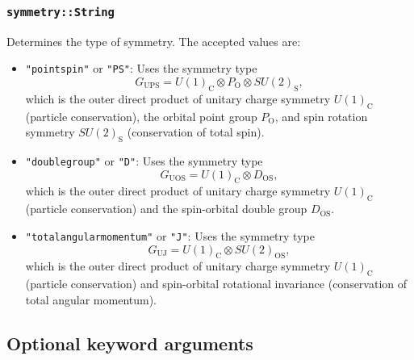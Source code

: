 \documentclass[notitlepage]{article}
\begin{document}
\subsubsection{\texttt{symmetry::String}}
\label{multiplets_symmetry}
Determines the type of symmetry. The accepted values are:
\begin{itemize}
    \item \texttt{"pointspin"} or \texttt{"PS"}: Uses
        the symmetry type
        \begin{equation}
            G_\text{UPS} = 
            U(1)_\text{C} \otimes
            P_\text{O} \otimes
            SU(2)_\text{S},
        \end{equation}
        which is the outer direct product of unitary charge
        symmetry $U(1)_\text{C}$ (particle conservation),
        the orbital point group $P_\text{O}$, and spin
        rotation symmetry $SU(2)_\text{S}$ (conservation of
        total spin).
    \item \texttt{"doublegroup"} or \texttt{"D"}: Uses 
        the symmetry type
        \begin{equation}
            G_\text{UOS} =
            U(1)_\text{C} \otimes
            D_\text{OS},
        \end{equation}
        which is the outer direct product of unitary charge
        symmetry $U(1)_\text{C}$ (particle conservation) and
        the spin-orbital double group $D_\text{OS}$.
    \item \texttt{"totalangularmomentum"} or \texttt{"J"}:
        Uses the symmetry type
        \begin{equation}
            G_\text{UJ} =
            U(1)_\text{C} \otimes
            SU(2)_\text{OS},
        \end{equation}
        which is the outer direct product of unitary charge
        symmetry $U(1)_\text{C}$ (particle conservation) and
        spin-orbital rotational invariance (conservation of
        total angular momentum).
\end{itemize}

\subsection{Optional keyword arguments}
\end{document}
